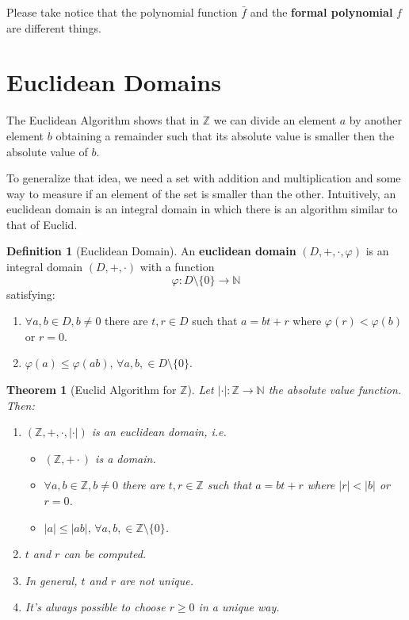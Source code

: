 \documentclass[12pt,a4paper]{article}
\newtheorem{theorem}{Theorem}[section]
\theoremstyle{definition}
\newtheorem{definition}{Definition}[section]
\begin{document}
Please take notice that the polynomial function $\bar{f}$ and the \textbf{formal polynomial} $f$ are different things.

\section{Euclidean Domains}

The Euclidean Algorithm shows that in $\mathbb{Z}$ we can divide an element $a$ by another element $b$ obtaining a remainder such that its absolute value is smaller then the absolute value of $b$. 

To generalize that idea, we need a set with addition and multiplication and some way to measure if an element of the set is smaller than the other. Intuitively, an euclidean domain is an integral domain in which there is an algorithm similar to that of Euclid.

\begin{definition}[Euclidean Domain]
An \textbf{euclidean domain} $(D, +, \cdot, \varphi)$ is an integral domain $(D,+,\cdot)$ with a function
\[
\varphi : D \setminus \{0 \} \to \mathbb{N}
\]
satisfying:
\begin{enumerate}
\item $\forall a,b \in D, b \neq 0$ there are $t, r \in D$ such that $a = bt+r$ where $\varphi(r) < \varphi(b)$ or $r = 0$.
\item $\varphi(a) \leq \varphi(ab), \, \forall a,b, \in D \setminus \{0\}$.
\end{enumerate}
\end{definition}

\begin{theorem}[Euclid Algorithm for $\mathbb{Z}$]
Let $ | \cdot | :  \mathbb{Z} \to \mathbb{N} $ the absolute value function. Then:
\begin{enumerate}
\item $(\mathbb{Z}, +, \cdot, | \cdot |)$ is an euclidean domain, i.e.
\begin{itemize}
\item $(\mathbb{Z}, + \cdot)$ is a domain.
\item $\forall a,b \in \mathbb{Z}, b \neq 0$ there are $t, r \in \mathbb{Z}$ such that $a = bt+r$ where $|r| < |b|$ or $r = 0$.
\item $|a| \leq |ab|, \, \forall a,b, \in \mathbb{Z} \setminus \{0\}$.
\end{itemize}
\item $t$ and $r$ can be computed.
\item In general, $t$ and $r$ are not unique.
\item It's always possible to choose $r \geq 0$ in a unique way.
\end{enumerate}
\end{theorem}
\end{document}
